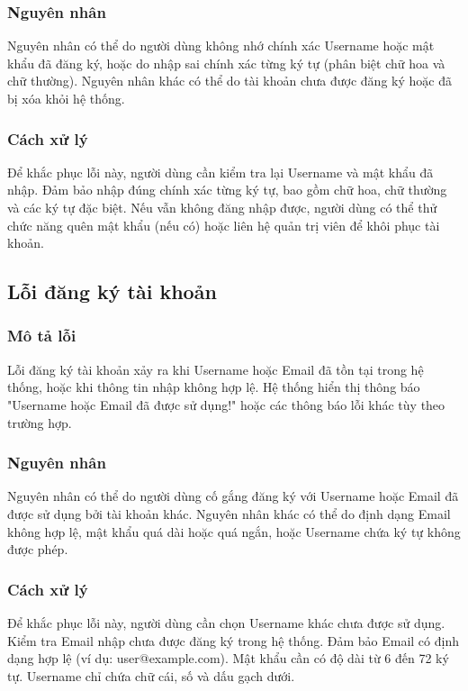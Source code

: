 \subsubsection{Nguyên nhân}

Nguyên nhân có thể do người dùng không nhớ chính xác Username hoặc mật khẩu đã đăng ký, hoặc do nhập sai chính xác từng ký tự (phân biệt chữ hoa và chữ thường). Nguyên nhân khác có thể do tài khoản chưa được đăng ký hoặc đã bị xóa khỏi hệ thống.

\subsubsection{Cách xử lý}

Để khắc phục lỗi này, người dùng cần kiểm tra lại Username và mật khẩu đã nhập. Đảm bảo nhập đúng chính xác từng ký tự, bao gồm chữ hoa, chữ thường và các ký tự đặc biệt. Nếu vẫn không đăng nhập được, người dùng có thể thử chức năng quên mật khẩu (nếu có) hoặc liên hệ quản trị viên để khôi phục tài khoản.

\subsection{Lỗi đăng ký tài khoản}

\subsubsection{Mô tả lỗi}

Lỗi đăng ký tài khoản xảy ra khi Username hoặc Email đã tồn tại trong hệ thống, hoặc khi thông tin nhập không hợp lệ. Hệ thống hiển thị thông báo "Username hoặc Email đã được sử dụng!" hoặc các thông báo lỗi khác tùy theo trường hợp.

\subsubsection{Nguyên nhân}

Nguyên nhân có thể do người dùng cố gắng đăng ký với Username hoặc Email đã được sử dụng bởi tài khoản khác. Nguyên nhân khác có thể do định dạng Email không hợp lệ, mật khẩu quá dài hoặc quá ngắn, hoặc Username chứa ký tự không được phép.

\subsubsection{Cách xử lý}

Để khắc phục lỗi này, người dùng cần chọn Username khác chưa được sử dụng. Kiểm tra Email nhập chưa được đăng ký trong hệ thống. Đảm bảo Email có định dạng hợp lệ (ví dụ: user@example.com). Mật khẩu cần có độ dài từ 6 đến 72 ký tự. Username chỉ chứa chữ cái, số và dấu gạch dưới.


